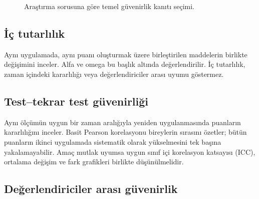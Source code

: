\begin{figure}[htbp]
\centering
{}
\caption{Araştırma sorusuna göre temel güvenirlik kanıtı seçimi.}
\label{fig:reliability-selection}
\end{figure}

\subsection{İç tutarlılık}

Aynı uygulamada, aynı puanı oluşturmak üzere birleştirilen maddelerin birlikte
değişimini inceler. Alfa ve omega bu başlık altında değerlendirilir. İç
tutarlılık, zaman içindeki kararlılığı veya değerlendiriciler arası uyumu
göstermez.

\subsection{Test--tekrar test güvenirliği}

Aynı ölçümün uygun bir zaman aralığıyla yeniden uygulanmasında puanların
kararlılığını inceler. Basit Pearson korelasyonu bireylerin sırasını özetler;
bütün puanların ikinci uygulamada sistematik olarak yükselmesini tek başına
yakalamayabilir. Amaç mutlak uyumsa uygun sınıf içi korelasyon katsayısı (ICC),
ortalama değişim ve fark grafikleri birlikte düşünülmelidir.

\subsection{Değerlendiriciler arası güvenirlik}

